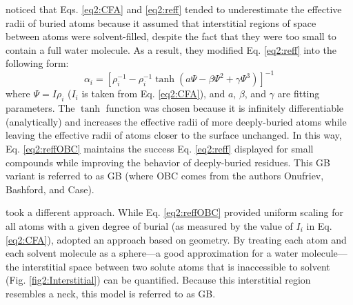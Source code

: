 \citeauthor{Onufriev_Proteins_2004_v55_p383} noticed that Eqs. \ref{eq2:CFA} and
\ref{eq2:reff} tended to underestimate the effective radii of buried atoms
because it assumed that interstitial regions of space between atoms were
solvent-filled, despite the fact that they were too small to contain a full
water molecule. \cite{Onufriev_Proteins_2004_v55_p383} As a result, they
modified Eq. \ref{eq2:reff} into the following form:
\begin{equation}
   \alpha _ i = \left[ \rho _ i ^ {-1} - \rho _ i ^ {-1} \tanh \left( a
   \Psi - \beta \Psi^2 + \gamma \Psi^3 \right) \right] ^ {-1}
   \label{eq2:reffOBC}
\end{equation}
where $\Psi = I \rho_i$ ($I_i$ is taken from Eq. \ref{eq2:CFA}), and $a$,
$\beta$, and $\gamma$ are fitting parameters. The $\tanh$ function was chosen
because it is infinitely differentiable (analytically) and increases the
effective radii of more deeply-buried atoms while leaving the effective radii of
atoms closer to the surface unchanged. In this way, Eq. \ref{eq2:reffOBC}
maintains the success Eq. \ref{eq2:reff} displayed for small compounds while
improving the behavior of deeply-buried residues.
\cite{Onufriev_Proteins_2004_v55_p383} This GB variant is referred to as
GB (where OBC comes from the authors Onufriev, Bashford, and Case).

\citeauthor{Mongan_JChemTheoryComput_2007_v3_p156} took a different approach.
While Eq. \ref{eq2:reffOBC} provided uniform scaling for all atoms with a given
degree of burial (as measured by the value of $I_i$ in Eq. \ref{eq2:CFA}),
\citeauthor{Mongan_JChemTheoryComput_2007_v3_p156} adopted an approach based on
geometry. By treating each atom and each solvent molecule as a sphere---a good
approximation for a water molecule---the interstitial space between two solute
atoms that is inaccessible to solvent (Fig. \ref{fig2:Interstitial}) can be
quantified. Because this interstitial region resembles a neck, this model is
referred to as GB. \cite{Mongan_JChemTheoryComput_2007_v3_p156}

